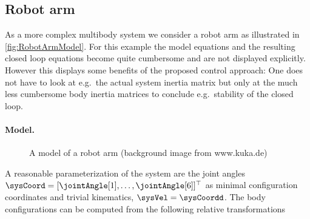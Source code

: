 \subsection{Robot arm}
As a more complex multibody system we consider a robot arm as illustrated in \autoref{fig:RobotArmModel}.
For this example the model equations and the resulting closed loop equations become quite cumbersome and are not displayed explicitly.
However this displays some benefits of the proposed control approach: One does not have to look at e.g.\ the actual system inertia matrix but only at the much less cumbersome body inertia matrices to conclude e.g.\ stability of the closed loop. 

\paragraph{Model.}
\begin{figure}[ht]
 \centering
 
 \caption{A model of a robot arm (background image from www.kuka.de)}
 \label{fig:RobotArmModel}
\end{figure}
A reasonable parameterization of the system are the joint angles $\sysCoord = [\jointAngle[1], \ldots, \jointAngle[6]]^\top$ as minimal configuration coordinates and trivial kinematics, \ie $\sysVel = \sysCoordd$.
The body configurations can be computed from the following relative transformations
